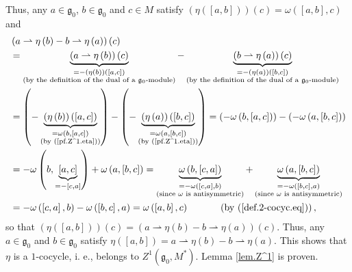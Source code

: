 \documentclass[etingof-lie.tex]{subfiles}
\begin{document}
Thus, any $a\in\mathfrak{g}_{0}$, $b\in\mathfrak{g}_{0}$ and $c\in M$ satisfy
$\left(  \eta\left(  \left[  a,b\right]  \right)  \right)  \left(  c\right)
=\omega\left(  \left[  a,b\right]  ,c\right)  $ and%
\begin{align*}
&  \left(  a\rightharpoonup\eta\left(  b\right)  -b\rightharpoonup\eta\left(
a\right)  \right)  \left(  c\right) \\
&  =\underbrace{\left(  a\rightharpoonup\eta\left(  b\right)  \right)  \left(
c\right)  }_{\substack{=-\left(  \eta\left(  b\right)  \right)  \left(
\left[  a,c\right]  \right)  \\\text{(by the definition of the dual of a
}\mathfrak{g}_{0}\text{-module)}}}-\underbrace{\left(  b\rightharpoonup
\eta\left(  a\right)  \right)  \left(  c\right)  }_{\substack{=-\left(
\eta\left(  a\right)  \right)  \left(  \left[  b,c\right]  \right)
\\\text{(by the definition of the dual of a }\mathfrak{g}_{0}\text{-module)}%
}}\\
&  =\left(  -\underbrace{\left(  \eta\left(  b\right)  \right)  \left(
\left[  a,c\right]  \right)  }_{\substack{=\omega\left(  b,\left[  a,c\right]
\right)  \\\text{(by (\ref{pf.Z^1.eta}))}}}\right)  -\left(
-\underbrace{\left(  \eta\left(  a\right)  \right)  \left(  \left[
b,c\right]  \right)  }_{\substack{=\omega\left(  a,\left[  b,c\right]
\right)  \\\text{(by (\ref{pf.Z^1.eta}))}}}\right)  =\left(  -\omega\left(
b,\left[  a,c\right]  \right)  \right)  -\left(  -\omega\left(  a,\left[
b,c\right]  \right)  \right) \\
&  =-\omega\left(  b,\underbrace{\left[  a,c\right]  }_{=-\left[  c,a\right]
}\right)  +\omega\left(  a,\left[  b,c\right]  \right)  =\underbrace{\omega
\left(  b,\left[  c,a\right]  \right)  }_{\substack{=-\omega\left(  \left[
c,a\right]  ,b\right)  \\\text{(since }\omega\text{ is antisymmetric)}%
}}+\underbrace{\omega\left(  a,\left[  b,c\right]  \right)  }%
_{\substack{=-\omega\left(  \left[  b,c\right]  ,a\right)  \\\text{(since
}\omega\text{ is antisymmetric)}}}\\
&  =-\omega\left(  \left[  c,a\right]  ,b\right)  -\omega\left(  \left[
b,c\right]  ,a\right)  =\omega\left(  \left[  a,b\right]  ,c\right)
\ \ \ \ \ \ \ \ \ \ \left(  \text{by (\ref{def.2-cocyc.eq})}\right)  ,
\end{align*}
so that $\left(  \eta\left(  \left[  a,b\right]  \right)  \right)  \left(
c\right)  =\left(  a\rightharpoonup\eta\left(  b\right)  -b\rightharpoonup
\eta\left(  a\right)  \right)  \left(  c\right)  $. Thus, any $a\in
\mathfrak{g}_{0}$ and $b\in\mathfrak{g}_{0}$ satisfy $\eta\left(  \left[
a,b\right]  \right)  =a\rightharpoonup\eta\left(  b\right)  -b\rightharpoonup
\eta\left(  a\right)  $. This shows that $\eta$ is a $1$-cocycle, i. e.,
belongs to $Z^{1}\left(  \mathfrak{g}_{0},M^{\ast}\right)  $. Lemma
\ref{lem.Z^1} is proven.
\end{document}
